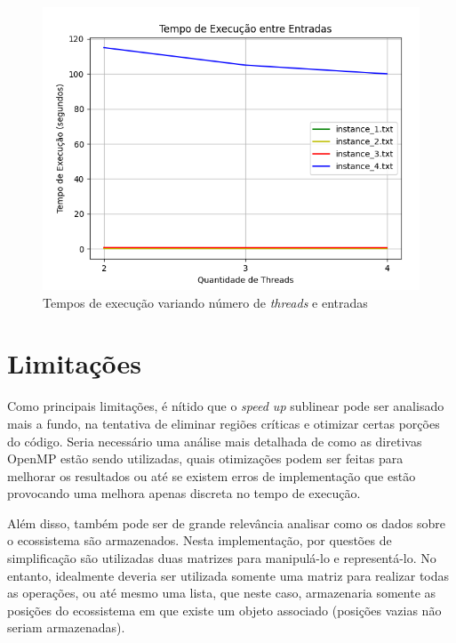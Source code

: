 \documentclass[a4paper, 12pt]{article}
\begin{document}
\vspace*{-0.8cm}
\begin{figure}[H]
    \centering
    \includegraphics[width=1\textwidth]{Images/parallel.png}
    \vspace*{-0.8cm}
    \caption{Tempos de execução variando número de \emph{threads} e entradas}
    \label{fig:map6}
\end{figure}

\section{Limitações}

Como principais limitações, é nítido que o \emph{speed up} sublinear pode ser analisado mais a fundo, na tentativa de eliminar regiões críticas e otimizar certas porções do código. Seria necessário uma análise mais detalhada de como as diretivas OpenMP estão sendo utilizadas, quais otimizações podem ser feitas para melhorar os resultados ou até se existem erros de implementação que estão provocando uma melhora apenas discreta no tempo de execução.

Além disso, também pode ser de grande relevância analisar como os dados sobre o ecossistema são armazenados. Nesta implementação, por questões de simplificação são utilizadas duas matrizes para manipulá-lo e representá-lo. No entanto, idealmente deveria ser utilizada somente uma matriz para realizar todas as operações, ou até mesmo uma lista, que neste caso, armazenaria somente as posições do ecossistema em que existe um objeto associado (posições vazias não seriam armazenadas).
\end{document}

